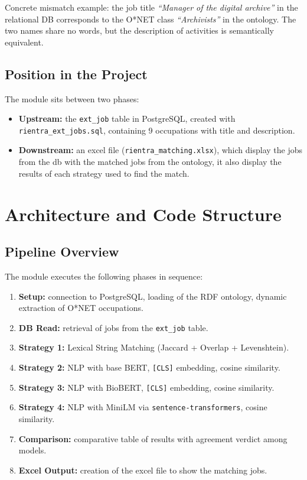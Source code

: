 \documentclass[12pt, a4paper]{report}
\begin{document}
\begin{notebox}
Concrete mismatch example: the job title \textit{``Manager of the
digital archive''} in the relational DB corresponds to the O*NET
class \textit{``Archivists''} in the ontology. The two names share
no words, but the description of activities is semantically
equivalent.
\end{notebox}

\section{Position in the Project}

The module sits between two phases:

\begin{itemize}
  \item \textbf{Upstream:} the \texttt{ext\_job} table in PostgreSQL,
        created with \texttt{rientra\_ext\_jobs.sql}, containing 9
        occupations with title and description.
  \item \textbf{Downstream:} an excel file
        (\texttt{rientra\_matching.xlsx}), which display the jobs from the db with the matched jobs from the ontology, it also display the results of each strategy used to find the match.
\end{itemize}

% 
\chapter{Architecture and Code Structure}
% 

\section{Pipeline Overview}

The module executes the following phases in sequence:

\begin{enumerate}
  \item \textbf{Setup:} connection to PostgreSQL, loading of the
        RDF ontology, dynamic extraction of O*NET occupations.
  \item \textbf{DB Read:} retrieval of jobs from the
        \texttt{ext\_job} table.
  \item \textbf{Strategy 1:} Lexical String Matching
        (Jaccard + Overlap + Levenshtein).
  \item \textbf{Strategy 2:} NLP with base BERT,
        \texttt{[CLS]} embedding, cosine similarity.
  \item \textbf{Strategy 3:} NLP with BioBERT,
        \texttt{[CLS]} embedding, cosine similarity.
  \item \textbf{Strategy 4:} NLP with MiniLM via
        \texttt{sentence-transformers}, cosine similarity.
  \item \textbf{Comparison:} comparative table of results
        with agreement verdict among models.
  \item \textbf{Excel Output:} creation of the excel file to show the matching jobs.
\end{enumerate}
\end{document}
